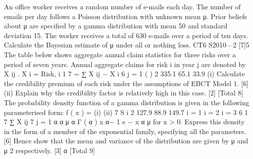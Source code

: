 An office worker receives a random number of e-mails each day. The number of
emails per day follows a Poisson distribution with unknown mean μ. Prior beliefs
about μ are specified by a gamma distribution with mean 50 and standard deviation
15. The worker receives a total of 630 e-mails over a period of ten days.
Calculate the Bayesian estimate of μ under all or nothing loss.
CT6 S2010—2
[7]5
The table below shows aggregate annual claim statistics for three risks over a period
of seven years. Annual aggregate claims for risk i in year j are denoted by X ij .
X i =
Risk, i
1 7
= ∑ X ij − X i
6 j = 1
(
)
2
335.1
65.1
33.9
(i) Calculate the credibility premium of each risk under the assumptions of EBCT
Model 1.
[6]
(ii) Explain why the credibility factor is relatively high in this case.
[2]
[Total 8]
The probability density function of a gamma distribution is given in the following
parameterised form:
f ( x ) =
(i)
(ii)
7
S i 2
127.9
88.9
149.7
i = 1
i = 2
i = 3
6
1 7
∑ X ij
7 j = 1
α α
μ α Γ ( α )
x
α− 1
e
−
x α
μ
for x > 0.
Express this density in the form of a member of the exponential family,
specifying all the parameters.
[6]
Hence show that the mean and variance of the distribution are given by μ and
μ 2
respectively.
[3]
α
[Total 9]


